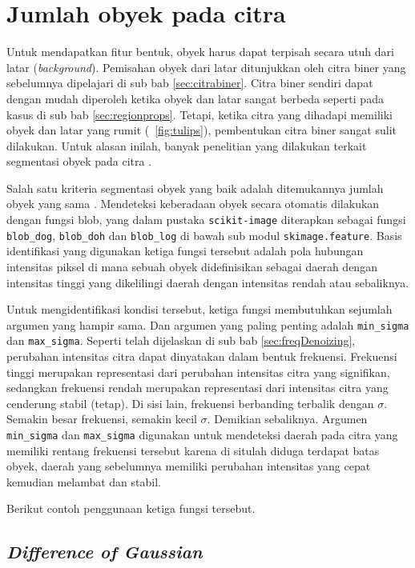  \section{Jumlah obyek pada citra}
Untuk mendapatkan fitur bentuk, obyek harus dapat terpisah secara utuh dari latar (\textit{background}). Pemisahan obyek dari latar ditunjukkan oleh citra biner yang sebelumnya dipelajari di sub bab \ref{sec:citrabiner}. Citra biner sendiri dapat dengan mudah diperoleh ketika obyek dan latar sangat berbeda seperti pada kasus di sub bab \ref{sec:regionprops}. Tetapi, ketika citra yang dihadapi memiliki obyek dan latar yang rumit (\figurename~\ref{fig:tulips}), pembentukan citra biner sangat sulit dilakukan. Untuk alasan inilah, banyak penelitian yang dilakukan terkait segmentasi obyek pada citra \cite{WANG20181}.
 
Salah satu kriteria segmentasi obyek yang baik adalah ditemukannya jumlah obyek yang sama \cite{CREVIER2008143}. Mendeteksi keberadaan obyek secara otomatis dilakukan dengan fungsi blob, yang dalam pustaka \texttt{scikit-image} diterapkan sebagai fungsi \texttt{blob\_dog}, \texttt{blob\_doh} dan \texttt{blob\_log} di bawah sub modul \texttt{skimage.feature}. Basis identifikasi yang digunakan ketiga fungsi tersebut adalah pola hubungan intensitas piksel di mana sebuah obyek didefinisikan sebagai daerah dengan intensitas tinggi yang dikelilingi daerah dengan intensitas rendah atau sebaliknya. 

Untuk mengidentifikasi kondisi tersebut, ketiga fungsi membutuhkan sejumlah argumen yang hampir sama. Dan argumen yang paling penting adalah \texttt{min\_sigma} dan \texttt{max\_sigma}. Seperti telah dijelaskan di sub bab \ref{sec:freqDenoizing}, perubahan intensitas citra dapat dinyatakan dalam bentuk frekuensi. Frekuensi tinggi merupakan representasi dari perubahan intensitas citra yang signifikan, sedangkan frekuensi rendah merupakan representasi dari intensitas citra yang cenderung stabil (tetap). Di sisi lain, frekuensi berbanding terbalik dengan $\sigma$. Semakin besar frekuensi, semakin kecil $\sigma$. Demikian sebaliknya. Argumen \texttt{min\_sigma} dan \texttt{max\_sigma} digunakan untuk mendeteksi daerah pada citra yang memiliki rentang frekuensi tersebut karena di situlah diduga terdapat batas obyek, daerah yang sebelumnya memiliki perubahan intensitas yang cepat kemudian melambat dan stabil. 

Berikut contoh penggunaan ketiga fungsi tersebut.

\subsection{\textit{Difference of Gaussian}}
 
